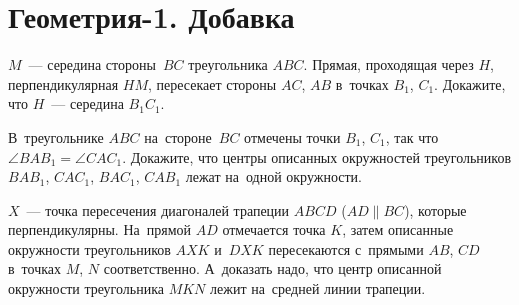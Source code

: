 
\section*{Геометрия-1. Добавка}


\begin{problems}

\item
$M$~--- середина стороны~$BC$ треугольника $ABC$.
Прямая, проходящая через $H$, перпендикулярная $HM$, пересекает стороны $AC$,
$AB$ в~точках $B_1$, $C_1$.
Докажите, что $H$~--- середина $B_1C_1$.

\item
В~треугольнике $ABC$ на~стороне~$BC$ отмечены точки $B_1$, $C_1$, так что
$\angle B A B_1 = \angle C A C_1$.
Докажите, что центры описанных окружностей треугольников $B A B_1$, $C A C_1$,
$B A C_1$, $C A B_1$ лежат на~одной окружности.

\item
$X$~--- точка пересечения диагоналей трапеции $ABCD$ ($AD \parallel BC$),
которые перпендикулярны.
На~прямой $AD$ отмечается точка $K$, затем описанные окружности треугольников
$AXK$ и~$DXK$ пересекаются с~прямыми $AB$, $CD$ в~точках $M$, $N$
соответственно.
А~доказать надо, что центр описанной окружности треугольника $MKN$ лежит
на~средней линии трапеции.

\end{problems}

